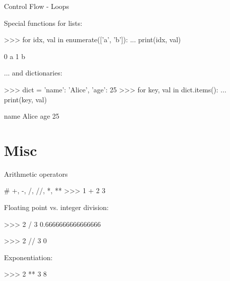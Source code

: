 \documentclass[10pt]{beamer}
\begin{document}

\begin{frame}[fragile]{Control Flow - Loops}

    Special functions for lists:

    \begin{pythoncode}
        >>> for idx, val in enumerate(['a', 'b']):
        ...     print(idx, val)

        0 a
        1 b
    \end{pythoncode}

    \pause

    ... and dictionaries:

    \begin{pythoncode}
        >>> dict = {'name': 'Alice', 'age': 25}
        >>> for key, val in dict.items():
        ...     print(key, val)

        name Alice
        age 25
    \end{pythoncode}
\end{frame}


\section{Misc}


\begin{frame}[fragile]{Arithmetic operators}

    \begin{pythoncode}
        # +, -, /, //, *, **
        >>> 1 + 2
        3
    \end{pythoncode}

    \pause

    Floating point vs. integer division:

    \begin{pythoncode}
        >>> 2 / 3
        0.6666666666666666

        >>> 2 // 3
        0
    \end{pythoncode}

    \pause

    Exponentiation:

    \begin{pythoncode}
        >>> 2 ** 3
        8
    \end{pythoncode}
\end{frame}
\end{document}

